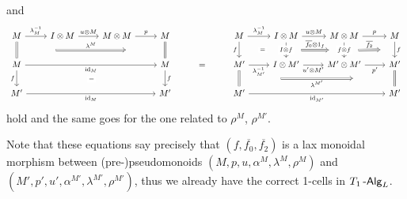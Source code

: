 \documentclass[a4paper,11pt,oneside,openany]{scrbook}
\begin{document}
and
\[\begin{tikzcd}
	M & {I\otimes M} & {M\otimes M} & M && M & {I\otimes M} & {M\otimes M} & M \\
	M &&& M & {=} & {M'} & {I\otimes M'} & {M'\otimes M'} & {M'} \\
	{M'} &&& {M'} && {M'} &&& {M'}
	\arrow["{\id_M}"', from=2-1, to=2-4]
	\arrow[""{name=0, anchor=center, inner sep=0}, Rightarrow, no head, from=1-1, to=2-1]
	\arrow[""{name=1, anchor=center, inner sep=0}, Rightarrow, no head, from=1-4, to=2-4]
	\arrow["p", from=1-3, to=1-4]
	\arrow["{u\otimes M}", from=1-2, to=1-3]
	\arrow["{\lambda_M^{-1}}", from=1-1, to=1-2]
	\arrow["{\id_M}"', from=3-1, to=3-4]
	\arrow["f"', from=2-1, to=3-1]
	\arrow["f", from=2-4, to=3-4]
	\arrow["{=}"{description}, draw=none, from=3-1, to=2-4]
	\arrow["{\id_{M'}}"', from=3-6, to=3-9]
	\arrow[""{name=2, anchor=center, inner sep=0}, Rightarrow, no head, from=2-9, to=3-9]
	\arrow[""{name=3, anchor=center, inner sep=0}, Rightarrow, no head, from=2-6, to=3-6]
	\arrow["{p'}"', from=2-8, to=2-9]
	\arrow[""{name=4, anchor=center, inner sep=0}, "f", from=1-9, to=2-9]
	\arrow[""{name=5, anchor=center, inner sep=0}, "{f\otimes f}"{description}, from=1-8, to=2-8]
	\arrow["{u'\otimes M'}"', from=2-7, to=2-8]
	\arrow[""{name=6, anchor=center, inner sep=0}, "{I\otimes f}"{description}, from=1-7, to=2-7]
	\arrow["{\lambda_{M'}^{-1}}"', from=2-6, to=2-7]
	\arrow[""{name=7, anchor=center, inner sep=0}, "f"', from=1-6, to=2-6]
	\arrow["{\lambda_M^{-1}}", from=1-6, to=1-7]
	\arrow["{u\otimes M}", from=1-7, to=1-8]
	\arrow["p", from=1-8, to=1-9]
	\arrow["{\lambda^M}", shorten <=45pt, shorten >=45pt, Rightarrow, from=0, to=1]
	\arrow["{=}"{description}, Rightarrow, draw=none, from=7, to=6]
	\arrow["{\overline{f_0}\otimes 1_f}", shorten <=17pt, shorten >=17pt, Rightarrow, from=6, to=5]
	\arrow["{\overline{f_2}}", shorten <=16pt, shorten >=16pt, Rightarrow, from=5, to=4]
	\arrow["{\lambda^{M'}}"', shorten <=48pt, shorten >=48pt, Rightarrow, from=3, to=2]
\end{tikzcd}\]
hold and the same goes for the one related to $\rho^M$, $\rho^{M'}$.

Note that these equations say precisely that $(f,\overline{f_0},\overline{f_2})$
is a lax monoidal morphism between (pre-)pseudomonoids
$(M,p,u,\alpha^M,\lambda^M,\rho^M)$ and
$(M',p',u',\alpha^{M'},\lambda^{M'},\rho^{M'})$, thus we already have the
correct 1-cells in $T_1\operatorname{-\mathsf{Alg}}_L$.
\end{document}
